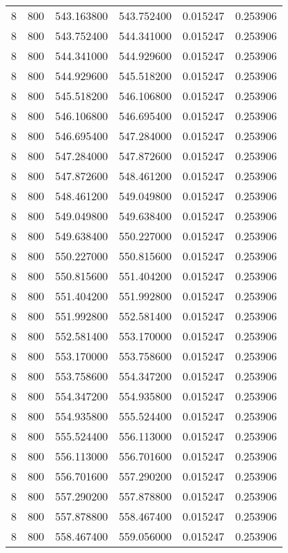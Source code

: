 \begin{longtable}{rrrrrr}
8 & 800 & 543.163800 & 543.752400 & 0.015247 & 0.253906 \\
8 & 800 & 543.752400 & 544.341000 & 0.015247 & 0.253906 \\
8 & 800 & 544.341000 & 544.929600 & 0.015247 & 0.253906 \\
8 & 800 & 544.929600 & 545.518200 & 0.015247 & 0.253906 \\
8 & 800 & 545.518200 & 546.106800 & 0.015247 & 0.253906 \\
8 & 800 & 546.106800 & 546.695400 & 0.015247 & 0.253906 \\
8 & 800 & 546.695400 & 547.284000 & 0.015247 & 0.253906 \\
8 & 800 & 547.284000 & 547.872600 & 0.015247 & 0.253906 \\
8 & 800 & 547.872600 & 548.461200 & 0.015247 & 0.253906 \\
8 & 800 & 548.461200 & 549.049800 & 0.015247 & 0.253906 \\
8 & 800 & 549.049800 & 549.638400 & 0.015247 & 0.253906 \\
8 & 800 & 549.638400 & 550.227000 & 0.015247 & 0.253906 \\
8 & 800 & 550.227000 & 550.815600 & 0.015247 & 0.253906 \\
8 & 800 & 550.815600 & 551.404200 & 0.015247 & 0.253906 \\
8 & 800 & 551.404200 & 551.992800 & 0.015247 & 0.253906 \\
8 & 800 & 551.992800 & 552.581400 & 0.015247 & 0.253906 \\
8 & 800 & 552.581400 & 553.170000 & 0.015247 & 0.253906 \\
8 & 800 & 553.170000 & 553.758600 & 0.015247 & 0.253906 \\
8 & 800 & 553.758600 & 554.347200 & 0.015247 & 0.253906 \\
8 & 800 & 554.347200 & 554.935800 & 0.015247 & 0.253906 \\
8 & 800 & 554.935800 & 555.524400 & 0.015247 & 0.253906 \\
8 & 800 & 555.524400 & 556.113000 & 0.015247 & 0.253906 \\
8 & 800 & 556.113000 & 556.701600 & 0.015247 & 0.253906 \\
8 & 800 & 556.701600 & 557.290200 & 0.015247 & 0.253906 \\
8 & 800 & 557.290200 & 557.878800 & 0.015247 & 0.253906 \\
8 & 800 & 557.878800 & 558.467400 & 0.015247 & 0.253906 \\
8 & 800 & 558.467400 & 559.056000 & 0.015247 & 0.253906 \\

\end{longtable}
